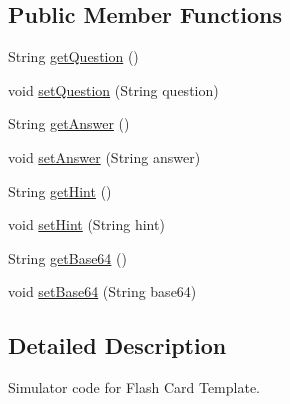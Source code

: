 \subsection*{Public Member Functions}
\begin{DoxyCompactItemize}
\item 
String \hyperlink{classorg_1_1buildmlearn_1_1toolkit_1_1flashcardtemplate_1_1FlashModel_a744ea87d54ba5157cdbcb1040e69513b}{get\-Question} ()
\item 
void \hyperlink{classorg_1_1buildmlearn_1_1toolkit_1_1flashcardtemplate_1_1FlashModel_a56b3cc8d0409716e1a9fc55da494b599}{set\-Question} (String question)
\item 
String \hyperlink{classorg_1_1buildmlearn_1_1toolkit_1_1flashcardtemplate_1_1FlashModel_a00d25c8fec3369101a07d40f4864f9ec}{get\-Answer} ()
\item 
void \hyperlink{classorg_1_1buildmlearn_1_1toolkit_1_1flashcardtemplate_1_1FlashModel_adcaaa02610df25395e0f3e8b3c2dbf9f}{set\-Answer} (String answer)
\item 
String \hyperlink{classorg_1_1buildmlearn_1_1toolkit_1_1flashcardtemplate_1_1FlashModel_a34763f0c06917ebe3935536c1bbc0892}{get\-Hint} ()
\item 
void \hyperlink{classorg_1_1buildmlearn_1_1toolkit_1_1flashcardtemplate_1_1FlashModel_a3e73de81abaa849ff6495f755cc71f4f}{set\-Hint} (String hint)
\item 
String \hyperlink{classorg_1_1buildmlearn_1_1toolkit_1_1flashcardtemplate_1_1FlashModel_a19f35d4b212678b8b75a33b3a7331f87}{get\-Base64} ()
\item 
void \hyperlink{classorg_1_1buildmlearn_1_1toolkit_1_1flashcardtemplate_1_1FlashModel_a421a4fae8a53309901249e6b16d3bab2}{set\-Base64} (String base64)
\end{DoxyCompactItemize}


\subsection{Detailed Description}
Simulator code for Flash Card Template. 

